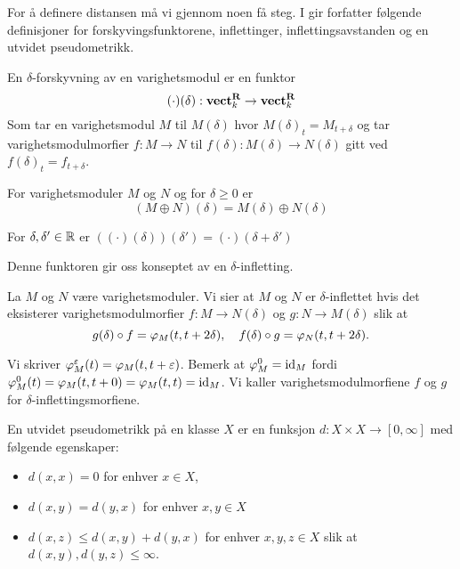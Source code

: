For å definere distansen må vi gjennom noen få steg.
I \citep[seksjon 3.1]{Bauer2015} gir forfatter følgende
definisjoner for forskyvingsfunktorene, inflettinger,
inflettingsavstanden og en utvidet pseudometrikk.
\begin{definisjon}\label{Def:DShift}
	En $\delta$-forskyvning av en varighetsmodul er en funktor
	\[(\cdot)(\delta): \textnormal{\textbf{vect}}_k^{\textnormal{\textbf{R}}}\to \textnormal{\textbf{vect}}_k^{\textnormal{\textbf{R}}}\]
	Som tar en varighetsmodul $M$ til $M(\delta)$ hvor
  $M(\delta)_t = M_{t+\delta}$ og tar
  varighetsmodulmorfier $f:M\to N$ til
  $f(\delta):M(\delta)\to N(\delta)$ gitt ved
  $f(\delta)_t=f_{t+\delta}$.
\end{definisjon}

\begin{lemma}\label{lem:DSShiftSplit}
  For varighetsmoduler $M$ og $N$ og for $\delta\geq0$ er
  \[(M\oplus N)(\delta) = M(\delta)\oplus N(\delta)\]
\end{lemma}

\begin{proposisjon}\label{kor:Shiftpluss}
For $\delta,\delta'\in\mathbb{R}$ er
  $((\cdot)(\delta))(\delta')=(\cdot)(\delta+\delta')$
\end{proposisjon}

Denne funktoren gir oss konseptet av en $\delta$-infletting.

\begin{definisjon}\label{Def:infletting}
	La $M$ og $N$ være varighetsmoduler. Vi sier at $M$ og
  $N$ er $\delta$-inflettet hvis det eksisterer
  varighetsmodulmorfier $f:M\to N(\delta)$ og $g:N\to
  M(\delta)$ slik at
	\[g(\delta)\circ f = \varphi_M(t,t+2\delta),\quad
  f(\delta)\circ g = \varphi_N(t,t+2\delta).\]
\end{definisjon}
Vi skriver $\varphi^\varepsilon_M(t) = \varphi_M(t,t+\varepsilon)$. Bemerk at
$\varphi^0_M=\textnormal{id}_M$ fordi $\varphi^0_M(t)
= \varphi_M(t,t+0)=\varphi_M(t,t)=\textnormal{id}_M$. Vi kaller
varighetsmodulmorfiene $f$ og $g$ for
$\delta$-inflettingsmorfiene.

\begin{definisjon}\label{def:UtPsMet}
   En utvidet pseudometrikk på en klasse $X$ er en
   funksjon $d: X\times X\to [0,\infty]$ med følgende
   egenskaper:
   \begin{itemize}
     \item $d(x,x) = 0$ for enhver $x\in X$,
     \item $d(x,y) = d(y,x)$ for enhver $x,y\in X$
     \item $d(x,z) \leq d(x,y) + d(y,x)$ for enhver
       $x,y,z\in X$ slik at $d(x,y),d(y,z)\leq\infty$.
   \end{itemize}
\end{definisjon}

